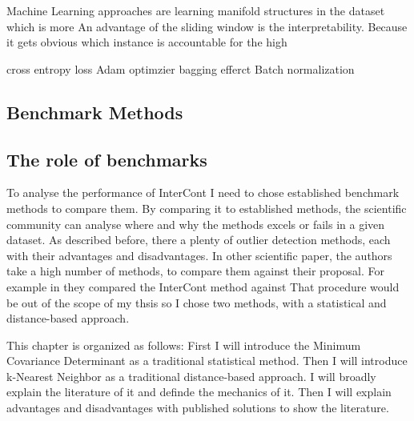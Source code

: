 

Machine Learning approaches are learning manifold structures in the dataset which is more 
An advantage of the sliding window is the interpretability. 
Because it gets obvious which instance is accountable for the high 













cross entropy loss Adam optimzier 
bagging efferct
Batch normalization 

\subsection{Benchmark Methods}


\subsection*{The role of benchmarks}
To analyse the performance of InterCont I need to chose established benchmark methods to compare them.
By comparing it to established methods, the scientific community can analyse where and why the methods excels or fails in a given dataset.
As described before, there a plenty of outlier detection methods, each with their advantages and disadvantages.
In other scientific paper, the authors take a high number of methods, to compare them against their proposal. 
For example in \citep{shenkar2022anomaly} they compared the InterCont method against
That procedure would be out of the scope of my thsis so I chose two methods, with a statistical and distance-based approach.


This chapter is organized as follows: 
First I will introduce the Minimum Covariance Determinant as a traditional statistical method.
Then I will introduce k-Nearest Neighbor as a traditional distance-based approach. 
I will broadly explain the literature of it and definde the mechanics of it. 
Then I will explain advantages and disadvantages with published solutions to show the literature.



